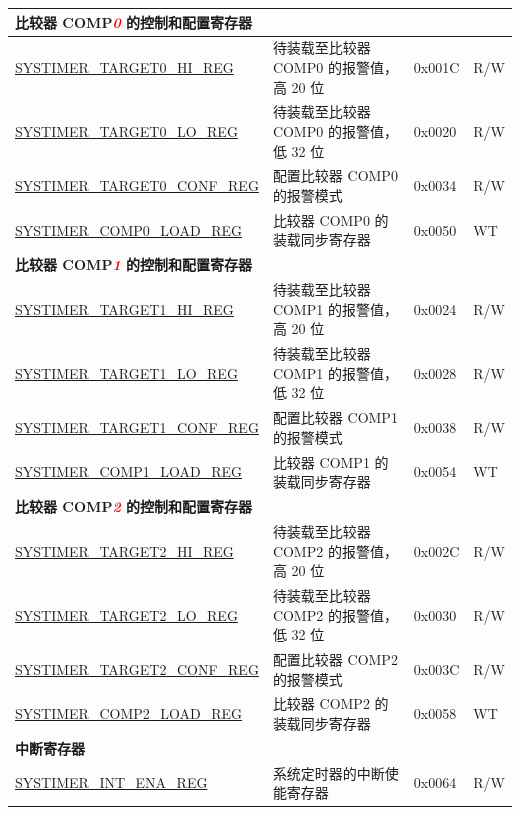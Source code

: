\begin{longtable}{ | p{5.5cm} | p{7.0cm} | p{1.3cm} | p{1.7cm} | }
\multicolumn{4}{|l|}{\textbf{比较器 COMP\textcolor{red}{\it{0}} 的控制和配置寄存器 }} \\ \hline
\hyperref[regdesc:SYSTIMERTARGET0HIREG]{SYSTIMER\_TARGET0\_HI\_REG} & 待装载至比较器 COMP0 的报警值，高 20 位 & 0x001C & R/W \\ \hline
\hyperref[regdesc:SYSTIMERTARGET0LOREG]{SYSTIMER\_TARGET0\_LO\_REG} & 待装载至比较器 COMP0 的报警值，低 32 位 & 0x0020 & R/W \\ \hline
\hyperref[regdesc:SYSTIMERTARGET0CONFREG]{SYSTIMER\_TARGET0\_CONF\_REG} & 配置比较器 COMP0 的报警模式 & 0x0034 & R/W \\ \hline
\hyperref[regdesc:SYSTIMERCOMP0LOADREG]{SYSTIMER\_COMP0\_LOAD\_REG} & 比较器 COMP0 的装载同步寄存器 & 0x0050 & WT \\ \hline
\multicolumn{4}{|l|}{\textbf{比较器 COMP\textcolor{red}{\it{1}} 的控制和配置寄存器}} \\ \hline
\hyperref[regdesc:SYSTIMERTARGET1HIREG]{SYSTIMER\_TARGET1\_HI\_REG} & 待装载至比较器 COMP1 的报警值，高 20 位 & 0x0024 & R/W \\ \hline
\hyperref[regdesc:SYSTIMERTARGET1LOREG]{SYSTIMER\_TARGET1\_LO\_REG} & 待装载至比较器 COMP1 的报警值，低 32 位 & 0x0028 & R/W \\ \hline
\hyperref[regdesc:SYSTIMERTARGET1CONFREG]{SYSTIMER\_TARGET1\_CONF\_REG} & 配置比较器 COMP1 的报警模式 & 0x0038 & R/W \\ \hline
\hyperref[regdesc:SYSTIMERCOMP1LOADREG]{SYSTIMER\_COMP1\_LOAD\_REG} & 比较器 COMP1 的装载同步寄存器 & 0x0054 & WT \\ \hline
\multicolumn{4}{|l|}{\textbf{比较器 COMP\textcolor{red}{\it{2}} 的控制和配置寄存器}} \\ \hline
\hyperref[regdesc:SYSTIMERTARGET2HIREG]{SYSTIMER\_TARGET2\_HI\_REG} & 待装载至比较器 COMP2 的报警值，高 20 位 & 0x002C & R/W \\ \hline
\hyperref[regdesc:SYSTIMERTARGET2LOREG]{SYSTIMER\_TARGET2\_LO\_REG} & 待装载至比较器 COMP2 的报警值，低 32 位 & 0x0030 & R/W \\ \hline
\hyperref[regdesc:SYSTIMERTARGET2CONFREG]{SYSTIMER\_TARGET2\_CONF\_REG} & 配置比较器 COMP2 的报警模式 & 0x003C & R/W \\ \hline
\hyperref[regdesc:SYSTIMERCOMP2LOADREG]{SYSTIMER\_COMP2\_LOAD\_REG} & 比较器 COMP2 的装载同步寄存器 & 0x0058 & WT \\ \hline
\multicolumn{4}{|l|}{\textbf{中断寄存器}} \\ \hline
\hyperref[regdesc:SYSTIMERINTENAREG]{SYSTIMER\_INT\_ENA\_REG} & 系统定时器的中断使能寄存器 & 0x0064 & R/W \\ \hline

\end{longtable}
